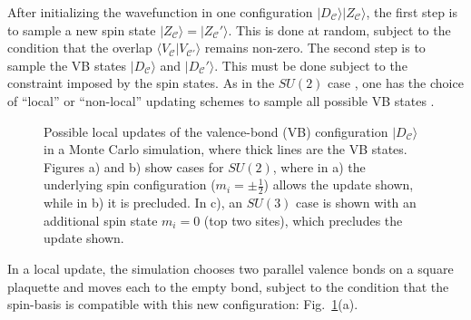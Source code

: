 \documentclass[11pt]{iopart}
\begin{document}
After initializing the wavefunction in one configuration $|D_{\mathcal C}  \rangle | Z_{\mathcal C}  \rangle$, the first step is to sample a new spin state $|Z_{\mathcal C}   \rangle = |Z_{\mathcal C} ' \rangle$.  This is done at random, subject to the condition that the overlap $\langle V_{\mathcal C} | V_{\mathcal C'} \rangle$ remains non-zero.  The second step is to sample the VB states $|D_{\mathcal C}  \rangle$ and $|D_{\mathcal C} ' \rangle$.  This must be done subject to the constraint imposed by the spin states.
As in the $SU(2)$ case \cite{RVB2,Ju2012}, one has the choice of ``local'' or ``non-local'' updating schemes to sample all possible VB states \cite{sandvik2010loop}.
\begin{figure}[t]
 \begin{center}
 \end{center}
 \caption{Possible local updates of the valence-bond (VB) configuration $|D_{\mathcal{C}} \rangle$ in a Monte Carlo simulation, where thick lines are the VB states.  Figures a) and b) show cases for $SU(2)$, where in a) the underlying spin configuration ($m_i = \pm \frac{1}{2}$) allows the update shown, while in b) it is precluded.  In c), an $SU(3)$ case is shown with an additional spin state $m_i = 0$ (top two sites), which precludes the update shown.}
 \label{fig:updates}
 \end{figure}
%
In a local update, the simulation chooses two parallel valence bonds on a square plaquette and moves each to the empty bond, subject to the condition that the spin-basis is compatible with this new configuration: Fig.~\ref{fig:updates}(a).
\end{document}
